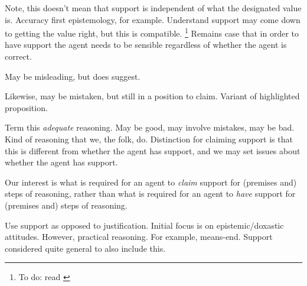 \begin{note}[Support]

  Note, this doesn't mean that support is independent of what the designated value is.
  Accuracy first epistemology, for example.
  Understand support may come down to getting the value right, but this is compatible.\nolinebreak
  \footnote{
    \color{red}
    To do: read \cite{Pettigrew:2019td}
  }
  Remains case that in order to have support the agent needs to be sensible regardless of whether the agent is correct.

  May be misleading, but does suggest.
  
  Likewise, may be mistaken, but still in a position to claim.
  Variant of highlighted proposition.
\end{note}

\begin{note}
  Term this \emph{adequate} reasoning.
  May be good, may involve mistakes, may be bad.
  Kind of reasoning that we, the folk, do.
  Distinction for claiming support is that this is different from whether the agent has support, and we may set issues about whether the agent has support.

  Our interest is what is required for an agent to \emph{claim} support for (premises and) steps of reasoning, rather than what is required for an agent to \emph{have} support for (premises and) steps of reasoning.

  Use support as opposed to justification.
  Initial focus is on epistemic/doxastic attitudes.
  However, practical reasoning.
  For example, means-end.
  Support considered quite general to also include this.
\end{note}

